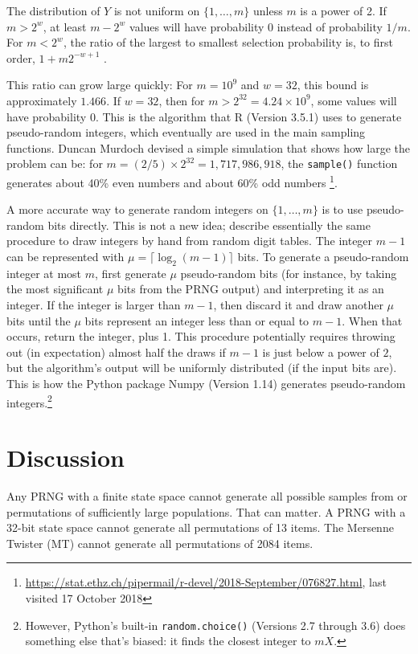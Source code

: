\documentclass[graybox]{svmult}
\begin{document}
The distribution of $Y$ is not uniform on $\{1, \ldots, m\}$ unless $m$ is a power of 2.
If $m > 2^w$, at least $m-2^w$ values will have probability 0 instead of probability $1/m$.
For $m < 2^w$, the ratio of the largest to smallest selection probability is, to first order,  $1+ m 2^{-w+1}$ \cite{knuth_art_1997}.

This ratio can grow large quickly: For $m = 10^9$ and $w=32$, this bound is approximately $1.466$. 
If $w=32$, then for $m>2^{32}=4.24 \times 10^9$, some values will have probability 0. 
This is the algorithm that R (Version 3.5.1) \cite{R_2018} uses to generate pseudo-random integers,
which eventually are used in the main sampling functions.
Duncan Murdoch devised a simple simulation that shows how large the problem can be:
for $m=  (2/5) \times 2^{32} = 1,717,986,918$, the \texttt{sample()} function generates about 40\% even numbers and about 60\% odd numbers \footnote{ %
\url{https://stat.ethz.ch/pipermail/r-devel/2018-September/076827.html}, last visited 17 October 2018
}. %

    
A more accurate way to generate random integers on $\{1, \dots, m\}$ is to use pseudo-random bits directly. 
This is not a new idea; \cite{hodges_basic_1970} describe essentially the same procedure to draw integers by hand
from random digit tables.
The integer $m-1$ can be represented with $\mu = \lceil \log_2(m-1) \rceil$ bits. 
To generate a pseudo-random integer at most $m$, first generate $\mu$ pseudo-random bits (for instance, by taking the most significant $\mu$ bits from the PRNG output) and interpreting it as an integer.  
If the integer is larger than $m-1$, then discard it and draw another $\mu$ bits until the $\mu$ bits represent an integer less than or equal to $m-1$.
When that occurs, return the integer, plus 1.
This procedure potentially requires throwing out (in expectation) almost half the draws if $m-1$ is 
just below a power of $2$, but the algorithm's output will be uniformly distributed (if the input bits are).
This is how the Python package Numpy (Version 1.14) generates pseudo-random integers.\footnote{
However, Python's built-in \texttt{random.choice()} (Versions 2.7 through 3.6) does something else that's biased: it finds the closest integer to $mX$.
}


\section{Discussion}
\label{sec:discussion}

Any PRNG with a finite state space cannot generate all possible samples from or permutations of 
sufficiently large populations.
That can matter.
A PRNG with a 32-bit state space cannot generate all permutations of 13 items.
The Mersenne Twister (MT) cannot generate all permutations of 2084 items.
\end{document}
